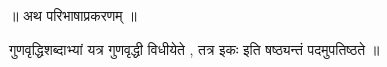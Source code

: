 ॥ अथ परिभाषाप्रकरणम्‌ ॥

गुणवृद्धिशब्दाभ्यां यत्र गुणवृद्धी विधीयेते , तत्र इकः इति षष्ठ्यन्तं पदमुपतिष्ठते ॥
